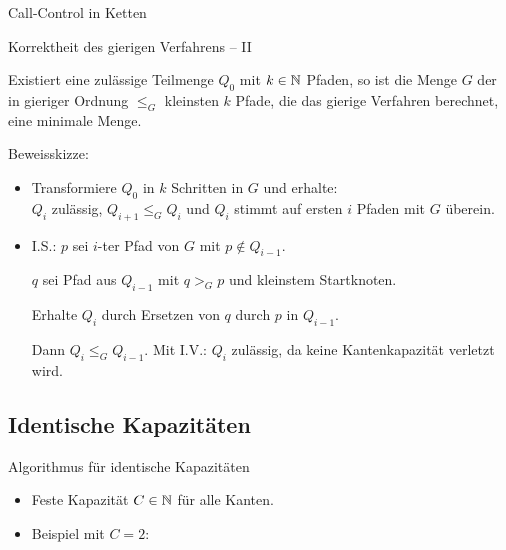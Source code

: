 \begin{section}{Call-Control in Ketten}
\begin{frame}{Korrektheit des gierigen Verfahrens -- II}
\begin{lemma}\label{lem:optimalityGreedyAlgorithm}
	Existiert eine zulässige Teilmenge $Q_0$ mit $k \in \mathbb N$ Pfaden, so ist die
	Menge $G$ der in gieriger Ordnung $\leq_G$ kleinsten $k$ Pfade, die das gierige Verfahren berechnet, eine minimale Menge.
\end{lemma}
\pause
Beweisskizze:
\begin{itemize}
	\item Transformiere $Q_0$ in $k$ Schritten in $G$ und erhalte:\\ $Q_i$ zulässig, $Q_{i+1} \leq_G Q_i$ und $Q_i$ stimmt auf ersten $i$ Pfaden mit $G$ überein.
	\pause
	\item I.S.: $p$ sei $i$-ter Pfad von $G$ \pause mit $p \notin Q_{i-1}$. 
		
		\pause $q$ sei Pfad aus $Q_{i-1}$ mit $q >_G p$ und kleinstem Startknoten.
		
		\pause Erhalte $Q_i$ durch Ersetzen von $q$ durch $p$ in $Q_{i-1}$.
		
		\pause Dann $Q_i \leq_G Q_{i-1}$. \pause Mit I.V.: $Q_i$ zulässig, da keine Kantenkapazität verletzt wird.
\end{itemize}
\end{frame}
	
\subsection{Identische Kapazitäten}
\begin{frame}[t]{Algorithmus für identische Kapazitäten}
	\begin{itemize}
		\item Feste Kapazität $C \in \mathbb N$ für alle Kanten.
		\pause \item Beispiel mit $C=2$:
	\end{itemize}



\end{frame}


\end{section}

